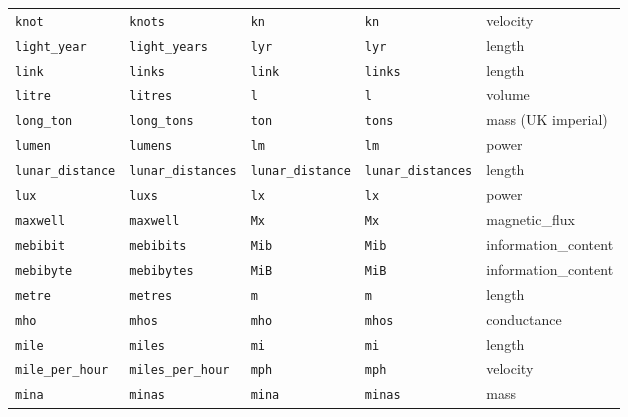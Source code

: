 \begin{landscape}
\begin{center}
\begin{longtable}{|lllll|}
{\tt\footnotesize knot} & {\tt\footnotesize knots} & {\tt\footnotesize kn} & {\tt\footnotesize kn} & velocity \\
{\tt\footnotesize light\_year} & {\tt\footnotesize light\_years} & {\tt\footnotesize lyr} & {\tt\footnotesize lyr} & length \\
{\tt\footnotesize link} & {\tt\footnotesize links} & {\tt\footnotesize link} & {\tt\footnotesize links} & length \\
{\tt\footnotesize litre} & {\tt\footnotesize litres} & {\tt\footnotesize l} & {\tt\footnotesize l} & volume \\
{\tt\footnotesize long\_ton} & {\tt\footnotesize long\_tons} & {\tt\footnotesize ton} & {\tt\footnotesize tons} & mass (UK imperial) \\
{\tt\footnotesize lumen} & {\tt\footnotesize lumens} & {\tt\footnotesize lm} & {\tt\footnotesize lm} & power \\
{\tt\footnotesize lunar\_distance} & {\tt\footnotesize lunar\_distances} & {\tt\footnotesize lunar\_distance} & {\tt\footnotesize lunar\_distances} & length \\
{\tt\footnotesize lux} & {\tt\footnotesize luxs} & {\tt\footnotesize lx} & {\tt\footnotesize lx} & power \\
{\tt\footnotesize maxwell} & {\tt\footnotesize maxwell} & {\tt\footnotesize Mx} & {\tt\footnotesize Mx} & magnetic\_flux \\
{\tt\footnotesize mebibit} & {\tt\footnotesize mebibits} & {\tt\footnotesize Mib} & {\tt\footnotesize Mib} & information\_content \\
{\tt\footnotesize mebibyte} & {\tt\footnotesize mebibytes} & {\tt\footnotesize MiB} & {\tt\footnotesize MiB} & information\_content \\
{\tt\footnotesize metre} & {\tt\footnotesize metres} & {\tt\footnotesize m} & {\tt\footnotesize m} & length \\
{\tt\footnotesize mho} & {\tt\footnotesize mhos} & {\tt\footnotesize mho} & {\tt\footnotesize mhos} & conductance \\
{\tt\footnotesize mile} & {\tt\footnotesize miles} & {\tt\footnotesize mi} & {\tt\footnotesize mi} & length \\
{\tt\footnotesize mile\_per\_hour} & {\tt\footnotesize miles\_per\_hour} & {\tt\footnotesize mph} & {\tt\footnotesize mph} & velocity \\
{\tt\footnotesize mina} & {\tt\footnotesize minas} & {\tt\footnotesize mina} & {\tt\footnotesize minas} & mass \\

\end{longtable}
\end{center}
\end{landscape}
